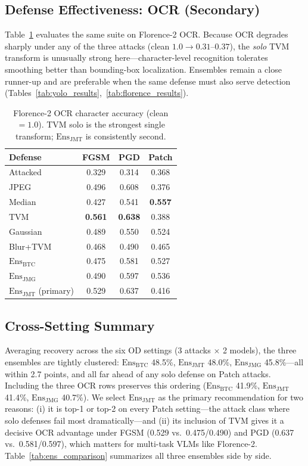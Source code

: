 \documentclass[10pt,twocolumn,letterpaper]{article}
\newcommand{\best}[1]{\textbf{#1}}
\begin{document}
\subsection{Defense Effectiveness: OCR (Secondary)}
Table~\ref{tab:ocr_results} evaluates the same suite on Florence-2 OCR. Because OCR degrades sharply under any of the three attacks (clean $1.0\to0.31$--$0.37$), the \emph{solo} TVM transform is unusually strong here---character-level recognition tolerates smoothing better than bounding-box localization. Ensembles remain a close runner-up and are preferable when the same defense must also serve detection (Tables~\ref{tab:yolo_results},~\ref{tab:florence_results}).

\begin{table}[t]
\centering
\small
\setlength{\tabcolsep}{3.5pt}
\begin{tabular}{l|c|c|c}
\toprule
Defense & FGSM & PGD & Patch \\
\midrule
Attacked       & 0.329 & 0.314 & 0.368 \\
\midrule
JPEG                   & 0.496 & 0.608 & 0.376 \\
Median                 & 0.427 & 0.541 & \best{0.557} \\
TVM                    & \best{0.561} & \best{0.638} & 0.388 \\
Gaussian               & 0.489 & 0.550 & 0.524 \\
Blur+TVM               & 0.468 & 0.490 & 0.465 \\
\midrule
$\mathrm{Ens}_{\text{BTC}}$           & 0.475 & 0.581 & 0.527 \\
$\mathrm{Ens}_{\text{JMG}}$           & 0.490 & 0.597 & 0.536 \\
$\mathrm{Ens}_{\text{JMT}}$ (primary) & 0.529 & 0.637 & 0.416 \\
\bottomrule
\end{tabular}
\caption{Florence-2 OCR character accuracy (clean $=1.0$). TVM solo is the strongest single transform; $\mathrm{Ens}_{\text{JMT}}$ is consistently second.}
\label{tab:ocr_results}
\end{table}

\subsection{Cross-Setting Summary}
Averaging recovery across the six OD settings (3 attacks $\times$ 2 models), the three ensembles are tightly clustered: $\mathrm{Ens}_{\text{BTC}}$ 48.5\%, $\mathrm{Ens}_{\text{JMT}}$ 48.0\%, $\mathrm{Ens}_{\text{JMG}}$ 45.8\%---all within 2.7 points, and all far ahead of any solo defense on Patch attacks. Including the three OCR rows preserves this ordering ($\mathrm{Ens}_{\text{BTC}}$ 41.9\%, $\mathrm{Ens}_{\text{JMT}}$ 41.4\%, $\mathrm{Ens}_{\text{JMG}}$ 40.7\%). We select $\mathrm{Ens}_{\text{JMT}}$ as the primary recommendation for two reasons: (i) it is top-1 or top-2 on every Patch setting---the attack class where solo defenses fail most dramatically---and (ii) its inclusion of TVM gives it a decisive OCR advantage under FGSM (0.529 vs.\ 0.475/0.490) and PGD (0.637 vs.\ 0.581/0.597), which matters for multi-task VLMs like Florence-2. Table~\ref{tab:ens_comparison} summarizes all three ensembles side by side.
\end{document}
